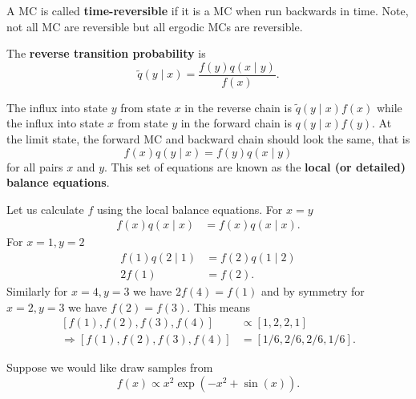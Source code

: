 \begin{defe} \label{defe: trmc}
    A MC is called {\bf time-reversible} if it is a MC when run backwards in time. Note, not all MC are reversible but all ergodic MCs are reversible.
\end{defe}

\begin{defe} \label{defe: rtp}
    The {\bf reverse transition probability} is
    \[
        \tilde{q} (y \mid x) = \frac{f(y) q(x \mid y)}{f(x)}.
    \]
\end{defe}

The influx into state $y$ from state $x$ in the reverse chain is $\tilde{q} (y \mid x) f(x)$ while the influx into state $x$ from state $y$ in the forward chain is $q (y \mid x) f(y)$. At the limit state, the forward MC and backward chain should look the same, that is
\begin{equation*}
    f(x) q(y \mid x) = f(y) q (x \mid y)
\end{equation*}
for all pairs $x$ and $y$. This set of equations are known as the {\bf local (or detailed) balance equations}.

\begin{exam} \label{exam: lbe}
    Let us calculate $f$ using the local balance equations. For $x=y$
    \begin{align*}
        f (x) q(x \mid x) & = f (x) q(x \mid x).
    \end{align*}
    For $x= 1, y=2$
    \begin{align*}
        f(1) q (2 \mid 1) & = f(2) q(1 \mid 2) \\
        2 f(1)            & = f(2).
    \end{align*}
    Similarly for $x=4, y=3$ we have $2 f(4) = f(1)$ and by symmetry for $x=2, y=3$ we have $f(2) = f(3)$. This means
    \begin{align*}
        \left[ f(1), f(2), f(3), f(4) \right]             & \propto \left[ 1,2,2,1 \right]    \\
        \Rightarrow \left[ f(1), f(2), f(3), f(4) \right] & = \left[ 1/6,2/6,2/6,1/6 \right].
    \end{align*}
\end{exam}

\begin{exam} \label{exam: MC_samp_1}
    Suppose we would like draw samples from
    \[
        f(x) \propto x^2 \exp \left( -x^2 + \sin (x) \right).
    \]
\end{exam}

